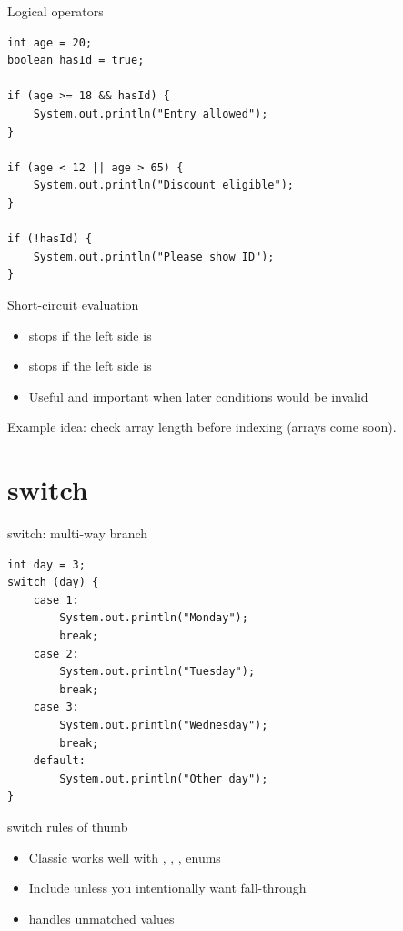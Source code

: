 \documentclass[aspectratio=169,11pt]{beamer}
\begin{document}
    \begin{frame}[fragile]{Logical operators}
        \begin{lstlisting}
int age = 20;
boolean hasId = true;

if (age >= 18 && hasId) {
    System.out.println("Entry allowed");
}

if (age < 12 || age > 65) {
    System.out.println("Discount eligible");
}

if (!hasId) {
    System.out.println("Please show ID");
}
        \end{lstlisting}
    \end{frame}

    \begin{frame}{Short-circuit evaluation}
        \begin{itemize}
            \item \javacode{\&\&} stops if the left side is 
            \item \javacode{||} stops if the left side is 
            \item Useful and important when later conditions would be invalid
        \end{itemize}
        \vspace{0.4em}
        Example idea: check array length before indexing (arrays come soon).
    \end{frame}

    \section{switch}

    \begin{frame}[fragile]{switch: multi-way branch}
        \begin{lstlisting}
int day = 3;
switch (day) {
    case 1:
        System.out.println("Monday");
        break;
    case 2:
        System.out.println("Tuesday");
        break;
    case 3:
        System.out.println("Wednesday");
        break;
    default:
        System.out.println("Other day");
}
        \end{lstlisting}
    \end{frame}

    \begin{frame}{switch rules of thumb}
        \begin{itemize}
            \item Classic  works well with , , , enums
            \item Include  unless you intentionally want fall-through
            \item {} handles unmatched values
        \end{itemize}
        \vspace{0.4em}
    \end{frame}
\end{document}
